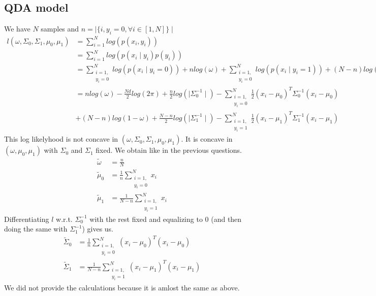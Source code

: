 \documentclass[]{article}
\begin{document}
\subsection{QDA model}
We have $N$ samples and $n=\mid \{i, y_i = 0, \forall i \in [1,N]\}\mid $
\begin{align*}
l(\omega,\Sigma_0, \Sigma_1, \mu_0,\mu_1) &= \sum_{i=1}^N log (p(x_i,y_i)) \\
&= \sum_{i=1}^N log(p(x_i \mid  y_i)p(y_i))\\
&= \sum_{\substack{i=1,\\ y_i=0}}^N log(p(x_i\mid y_i=0)) + nlog(\omega) +  \sum_{\substack{i=1,\\ y_i=0}}^N log(p(x_i\mid y_i=1)) + (N-n)log(1 - \omega)\\
&= nlog(\omega) - \frac{Nd}{2}log(2\pi) + \frac{n}{2}log(\mid \Sigma_0^{-1}\mid)  - \sum_{\substack{i=1,\\ y_i=0}}^N \frac{1}{2}(x_i - \mu_0)^T \Sigma_0^{-1}(x_i - \mu_0) \\ & + (N-n)log(1 -\omega) + \frac{N-n}{2}log(\mid \Sigma_1^{-1}\mid) - \sum_{\substack{i=1,\\ y_i=1}}^N \frac{1}{2}(x_i - \mu_1)^T \Sigma_1^{-1}(x_i - \mu_1)
\end{align*}
This log likelyhood is not concave in $(\omega,\Sigma_0, \Sigma_1, \mu_0, \mu_1)$. It is concave in $(\omega, \mu_0, \mu_1)$ with $\Sigma_0$ and $\Sigma_1$ fixed. We obtain like in the previous questions.
\begin{align*}
\tilde{\omega} &= \frac{n}{N} \\
\tilde{\mu}_0 &= \frac{1}{n} \sum_{\substack{i=1,\\ y_i=0}}^N x_i \\
\tilde{\mu}_1 &= \frac{1}{N-n} \sum_{\substack{i=1,\\ y_i=1}}^N x_i
\end{align*}
Differentiating $l$ w.r.t. $\Sigma_0^{-1}$ with the rest fixed and equalizing to 0 (and then doing the same with $\Sigma_1^{-1}$) gives us.
\begin{align*}
\tilde{\Sigma}_0 &= \frac{1}{n} \sum_{\substack{i=1,\\ y_i=0}}^N (x_i - \mu_0)^T(x_i - \mu_0) \\
\tilde{\Sigma}_1 &= \frac{1}{N-n} \sum_{\substack{i=1,\\ y_i=1}}^N (x_i - \mu_1)^T(x_i - \mu_1)
\end{align*}
We did not provide the calculations because it is amlost the same as above.
\end{document}
